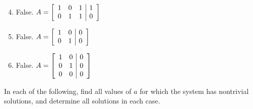 \begin{multicols}{2}
\begin{ex}
\begin{sol}
\begin{enumerate}[label={\alph*.}]
\setcounter{enumi}{3}
\item  False. 
$A =
\left[ \begin{array}{rrr|r}
	1 & 0 & 1 & 1 \\
	0 & 1 & 1 & 0	
\end{array} \right]$

\setcounter{enumi}{5}
\item  False. 
$A =
\left[ \begin{array}{rr|r}
	1 & 0 & 0 \\
	0 & 1 & 0	
\end{array} \right]$

\setcounter{enumi}{7}
\item  False. 
$A =
\left[ \begin{array}{rr|r}
	1 & 0 & 0 \\
	0 & 1 & 0 \\
	0 & 0 & 0
\end{array} \right]$

\end{enumerate}
\end{sol}
\end{ex}

\begin{ex}
In each of the following, find all values of $a$ for which the system has nontrivial solutions, and determine all solutions in each case.


\end{ex}
\end{multicols}
